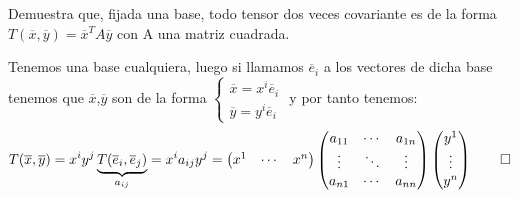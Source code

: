 \begin{problem}[2] Demuestra que, fijada una base, todo tensor dos veces covariante es de la forma $T(\overline{x},\overline{y})=\overline{x}^TA\overline{y}$ con A una matriz cuadrada.
	
	\solution Tenemos una base cualquiera, luego si llamamos $\overline{e}_i$ a los vectores de dicha base tenemos que $\overline{x}$,$\overline{y}$ son de la forma $\begin{cases}\overline{x}=x^i\overline{e}_i\\\overline{y}=y^i\overline{e}_i\end{cases}$ y por tanto tenemos: $$T(\overline{x},\overline{y})=x^iy^j\underbrace{T(\overline{e}_i,\overline{e}_j)}_{a_{ij}}=x^ia_{ij}y^j=\begin{pmatrix}x^1&\cdots&x^n\end{pmatrix}\begin{pmatrix}a_{11}&\cdots&a_{1n}\\\vdots&\ddots&\vdots\\a_{n1}&\cdots&a_{nn}\end{pmatrix}\begin{pmatrix}y^1\\\vdots\\y^n\end{pmatrix}\qed$$
\end{problem}
